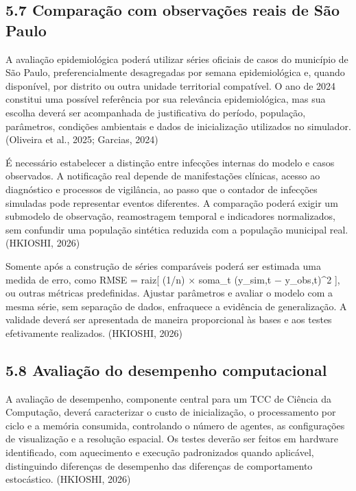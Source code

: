 \subsection{5.7 Comparação com observações reais de São
Paulo}\label{comparauxe7uxe3o-com-observauxe7uxf5es-reais-de-suxe3o-paulo}

A avaliação epidemiológica poderá utilizar séries oficiais de casos do
município de São Paulo, preferencialmente desagregadas por semana
epidemiológica e, quando disponível, por distrito ou outra unidade
territorial compatível. O ano de 2024 constitui uma possível referência
por sua relevância epidemiológica, mas sua escolha deverá ser
acompanhada de justificativa do período, população, parâmetros,
condições ambientais e dados de inicialização utilizados no simulador.
(Oliveira et al., 2025; Garcias, 2024)

É necessário estabelecer a distinção entre infecções internas do modelo
e casos observados. A notificação real depende de manifestações
clínicas, acesso ao diagnóstico e processos de vigilância, ao passo que
o contador de infecções simuladas pode representar eventos diferentes. A
comparação poderá exigir um submodelo de observação, reamostragem
temporal e indicadores normalizados, sem confundir uma população
sintética reduzida com a população municipal real. (HKIOSHI, 2026)

Somente após a construção de séries comparáveis poderá ser estimada uma
medida de erro, como RMSE = raiz{[} (1/n) × soma\_t (y\_sim,t −
y\_obs,t)\^{}2 {]}, ou outras métricas predefinidas. Ajustar parâmetros
e avaliar o modelo com a mesma série, sem separação de dados, enfraquece
a evidência de generalização. A validade deverá ser apresentada de
maneira proporcional às bases e aos testes efetivamente realizados.
(HKIOSHI, 2026)

\subsection{5.8 Avaliação do desempenho
computacional}\label{avaliauxe7uxe3o-do-desempenho-computacional}

A avaliação de desempenho, componente central para um TCC de Ciência da
Computação, deverá caracterizar o custo de inicialização, o
processamento por ciclo e a memória consumida, controlando o número de
agentes, as configurações de visualização e a resolução espacial. Os
testes deverão ser feitos em hardware identificado, com aquecimento e
execução padronizados quando aplicável, distinguindo diferenças de
desempenho das diferenças de comportamento estocástico. (HKIOSHI, 2026)

